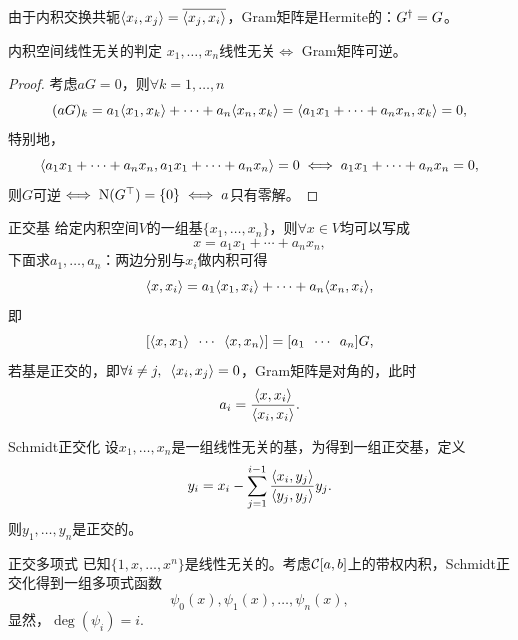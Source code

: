 \begin{corollary}
    由于内积交换共轭$\langle x_i,x_j\rangle = \overline{\langle x_j,x_i\rangle}$，Gram矩阵是Hermite的：$G^\dagger = G$。
\end{corollary}

\begin{theorem}
    {内积空间线性无关的判定}{}
    $x_1,\ldots,x_n$线性无关$\iff$ Gram矩阵可逆。
\end{theorem}

\begin{proof}
    考虑$aG = 0$，则$\forall k = 1,\ldots,n$
    \[
        (aG)_k = a_1\langle x_1,x_k\rangle + \cdots + a_n\langle x_n,x_k\rangle = \langle a_1x_1 + \cdots + a_nx_n,x_k\rangle = 0,
    \]
    特别地，
    \[
        \langle a_1x_1 + \cdots + a_nx_n,a_1x_1 + \cdots + a_nx_n\rangle = 0 \iff a_1x_1 + \cdots + a_nx_n = 0,
    \]
    则$G$可逆$\iff \operatorname{N}(G^\top) = \{0\} \iff a$只有零解。
\end{proof}

\begin{example}
    {正交基}{}
    给定内积空间$V$的一组基$\{x_1,\ldots,x_n\}$，则$\forall x \in V$均可以写成
    \[
        x = a_1x_1 + \cdots + a_nx_n,
    \]
    下面求$a_1,\ldots,a_n$：两边分别与$x_i$做内积可得
    \[
        \langle x,x_i\rangle = a_1\langle x_1,x_i\rangle + \cdots + a_n\langle x_n,x_i\rangle,
    \]
    即
    \[
        [\langle x,x_1\rangle\enspace\cdots\enspace\langle x,x_n\rangle] = [a_1\enspace\cdots\enspace a_n]G,
    \]
    若基是正交的，即$\forall i \neq j,\enspace\langle x_i,x_j\rangle = 0$，Gram矩阵是对角的，此时
    \begin{equation}\label{eq:na-orthogonal-coordinates}
        a_i = \frac{\langle x,x_i\rangle}{\langle x_i,x_i\rangle}.
    \end{equation}
\end{example}

\begin{theorem}
    {Schmidt正交化}{}
    设$x_1,\ldots,x_n$是一组线性无关的基，为得到一组正交基，定义
    \begin{equation}
        y_i = x_i - \sum_{j=1}^{i-1}\frac{\langle x_i,y_j\rangle}{\langle y_j,y_j\rangle}y_j.
    \end{equation}
    则$y_1,\ldots,y_n$是正交的。
\end{theorem}

\begin{definition}
    {正交多项式}{}
    已知$\{1,x,\ldots,x^n\}$是线性无关的。考虑$\mathcal{C}[a,b]$上的带权内积，Schmidt正交化得到一组多项式函数
    \[
        \psi_0(x),\psi_1(x),\ldots,\psi_n(x),
    \]
    显然，$\deg(\psi_i) = i.$
\end{definition}

